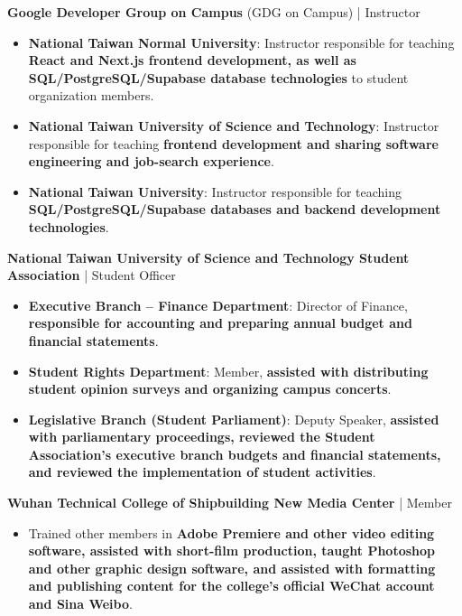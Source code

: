 \documentclass{resume}
\begin{document}
  \datedsubsection
  {\textbf{Google Developer Group on Campus} (GDG on Campus) | Instructor}
  {}
  \begin{itemize}
    \item \textbf{National Taiwan Normal University}: Instructor responsible for teaching \textbf{React and Next.js frontend development, as well as SQL/PostgreSQL/Supabase database technologies} to student organization members.
    \item \textbf{National Taiwan University of Science and Technology}: Instructor responsible for teaching \textbf{frontend development and sharing software engineering and job-search experience}.
    \item \textbf{National Taiwan University}: Instructor responsible for teaching \textbf{SQL/PostgreSQL/Supabase databases and backend development technologies}.
  \end{itemize}

  \datedsubsection
  {\textbf{National Taiwan University of Science and Technology Student Association} | Student Officer}
  {}
  \begin{itemize}
    \item \textbf{Executive Branch -- Finance Department}: Director of Finance, \textbf{responsible for accounting and preparing annual budget and financial statements}.
    \item \textbf{Student Rights Department}: Member, \textbf{assisted with distributing student opinion surveys and organizing campus concerts}.
    \item \textbf{Legislative Branch (Student Parliament)}: Deputy Speaker, \textbf{assisted with parliamentary proceedings, reviewed the Student Association's executive branch budgets and financial statements, and reviewed the implementation of student activities}.
  \end{itemize}

  \datedsubsection
  {\textbf{Wuhan Technical College of Shipbuilding New Media Center} | Member}
  {}
  \begin{itemize}
    \item Trained other members in \textbf{Adobe Premiere and other video editing software, assisted with short-film production, taught Photoshop and other graphic design software, and assisted with formatting and publishing content for the college's official WeChat account and Sina Weibo}.
  \end{itemize}
\end{document}
